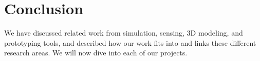 \section{Conclusion}

We have discussed related work from simulation, sensing, 3D modeling, and prototyping tools, and described how our work fits into and links these different research areas. We will now dive into each of our projects.
